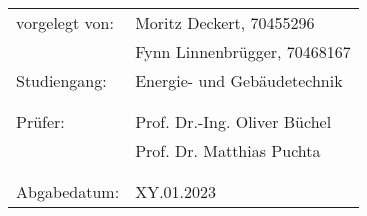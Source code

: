 
\maketitle
\begin{center}
	\begin{tabular}{ll}
		vorgelegt von: & Moritz Deckert, 70455296 \vspace{2mm}\\	
		& Fynn Linnenbrügger, 70468167 \vspace{2mm}\\	
		Studiengang: & Energie- und Gebäudetechnik \vspace{2mm}\\
		& \\
		& \\	
		Prüfer:&Prof. Dr.-Ing. Oliver Büchel \vspace{2mm}\\	
		& Prof. Dr. Matthias Puchta \vspace{2mm}\\	
		& \\
		& \\
		Abgabedatum:& XY.01.2023
	\end{tabular}
\end{center}
